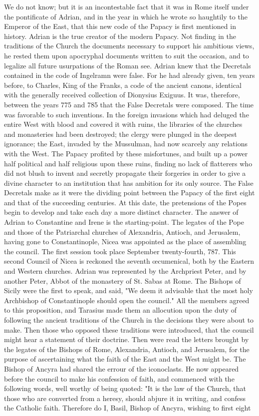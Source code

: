 We do not know; but it is an incontestable fact that it was in Rome itself under the pontificate of Adrian, and in the year in which he wrote so haughtily to the Emperor of the East, that this new code of the Papacy is first mentioned in history. Adrian is the true creator of the modern Papacy. Not finding in the traditions of the Church the documents necessary to support his ambitious views, he rested them upon apocryphal documents written to suit the occasion, and to legalize all future usurpations of the Roman see. Adrian knew that the Decretals contained in the code of Ingelramn were false. For he had already given, ten years before, to Charles, King of the Franks, a code of the ancient canons, identical with the generally received collection of Dionysius Exiguus. It was, therefore, between the years 775 and 785 that the False Decretals were composed. The time was favorable to such inventions. In the foreign invasions which had deluged the entire West with blood and covered it with ruins, the libraries of the churches and monasteries had been destroyed; the clergy were plunged in the deepest ignorance; the East, invaded by the Mussulman, had now scarcely any relations with the West. The Papacy profited by these misfortunes, and built up a power half political and half religious upon these ruins, finding no lack of flatterers who did not blush to invent and secretly propagate their forgeries in order to give a divine character to an institution that has ambition for its only source. The False Decretals make as it were the dividing point between the Papacy of the first eight and that of the succeeding centuries. At this date, the pretensions of the Popes begin to develop and take each day a more distinct character. The answer of Adrian to Constantine and Irene is the starting-point. The legates of the Pope and those of the Patriarchal churches of Alexandria, Antioch, and Jerusalem, having gone to Constantinople, Nicea was appointed as the place of assembling the council. The first session took place September twenty-fourth, 787. This second Council of Nicea is reckoned the seventh œcumenical, both by the Eastern and Western churches. Adrian was represented by the Archpriest Peter, and by another Peter, Abbot of the monastery of St. Sabas at Rome. The Bishops of Sicily were the first to speak, and said, "We deem it advisable that the most holy Archbishop of Constantinople should open the council." All the members agreed to this proposition, and Tarasius made them an allocution upon the duty of following the ancient traditions of the Church in the decisions they were about to make. Then those who opposed these traditions were introduced, that the council might hear a statement of their doctrine. Then were read the letters brought by the legates of the Bishops of Rome, Alexandria, Antioch, and Jerusalem, for the purpose of ascertaining what the faith of the East and the West might be. The Bishop of Ancyra had shared the errour of the iconoclasts. He now appeared before the council to make his confession of faith, and commenced with the following words, well worthy of being quoted: "It is the law of the Church, that those who are converted from a heresy, should abjure it in writing, and confess the Catholic faith. Therefore do I, Basil, Bishop of Ancyra, wishing to first eight 